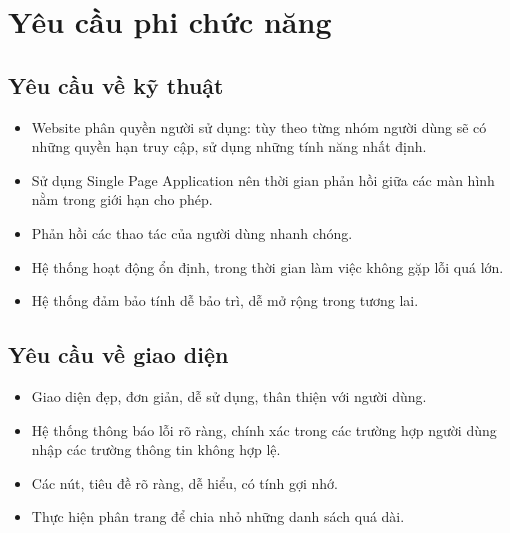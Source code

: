 \documentclass[../DoAn.tex]{subfiles}
\begin{document}
\section{Yêu cầu phi chức năng}
\label{section:2.4}
\subsection{Yêu cầu về kỹ thuật}
\label{subsection:2.4.1}
\begin{itemize}
    \item Website phân quyền người sử dụng: tùy theo từng nhóm người dùng sẽ có những quyền hạn truy cập, sử dụng những tính năng nhất định. 
    \item Sử dụng Single Page Application nên thời gian phản hồi giữa các màn hình nằm trong giới hạn cho phép.
    \item Phản hồi các thao tác của người dùng nhanh chóng.
    \item Hệ thống hoạt động ổn định, trong thời gian làm việc không gặp lỗi quá lớn.
    \item Hệ thống đảm bảo tính dễ bảo trì, dễ mở rộng trong tương lai.
\end{itemize}
\subsection{Yêu cầu về giao diện}
\label{subsection:2.4.2}
\begin{itemize}
    \item Giao diện đẹp, đơn giản, dễ sử dụng, thân thiện với người dùng.
    \item Hệ thống thông báo lỗi rõ ràng, chính xác trong các trường hợp người dùng nhập các trường thông tin không hợp lệ.
    \item Các nút, tiêu đề rõ ràng, dễ hiểu, có tính gợi nhớ.
    \item Thực hiện phân trang để chia nhỏ những danh sách quá dài.
\end{itemize}

\end{document}
